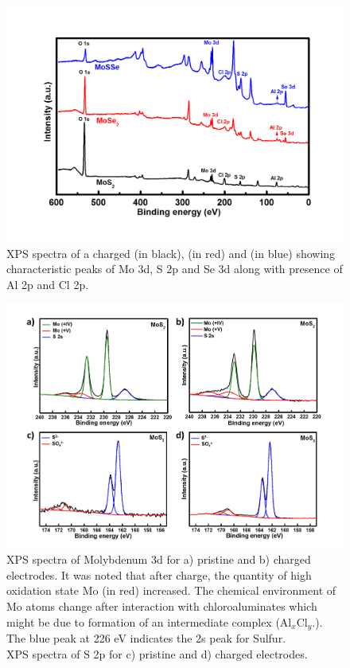 \begin{figure}[htb!]
\centering
\includegraphics[width=\textwidth]{Figures/chap4fig/S6}
\caption{XPS spectra of a charged  (in black),  (in red) and  (in blue) showing characteristic peaks of Mo 3d, S 2p and Se 3d along with presence of Al 2p and Cl 2p.}
\label{Figures/chap4fig:S6}
\end{figure}
\begin{figure}[htb!]
\centering
\includegraphics[width=\textwidth]{Figures/chap4fig/S7}
\caption{XPS spectra of Molybdenum 3d for a) pristine and b) charged  electrodes. It was noted that after charge, the quantity of high oxidation state Mo (in red) increased. The chemical environment of Mo atoms change after interaction with chloroaluminates which might be due to formation of an intermediate complex (Al$_x$Cl$_y$.). The blue peak at 226 eV indicates the 2s peak for Sulfur. \\XPS spectra of S 2p for c) pristine and d) charged  electrodes.}
\label{Figures/chap4fig:S7}
\end{figure}

